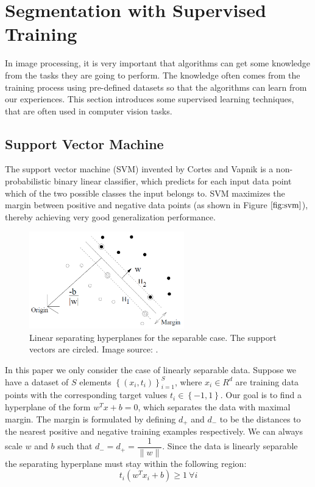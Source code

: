 \documentclass{SMBV13}
\begin{document}
\section{Segmentation with Supervised Training}
\label{sec:supervised_learning}
In image processing, it is very important that algorithms can get some knowledge from the tasks they are going to perform. The knowledge often comes from the training process using pre-defined datasets so that the algorithms can learn from our experiences. This section introduces some supervised learning techniques, that are often used in computer vision tasks.


\subsection{Support Vector Machine}
\label{sec:svm}

The support vector machine (SVM) invented by Cortes and Vapnik \cite{cortes1995support} is a non-probabilistic binary linear classifier, which predicts for each input data point which of the two possible classes the input belongs to. SVM maximizes the margin between positive and negative data points (as shown in Figure $\ref{fig:svm}$), thereby achieving very good generalization performance.

\begin{figure}[htbp]
    \centering
    \includegraphics[width=0.60\textwidth]{Bilder/SMBV13_EMuster_fig9}
    \caption{Linear separating hyperplanes for the separable case. The support vectors are circled. Image source: \cite{burges1998tutorial}.}
    \label{fig:svm}
\end{figure}

In this paper we only consider the case of linearly separable data. Suppose we have a dataset of $S$ elements $\left\lbrace (x_i, t_i)\right\rbrace _{i=1}^S$, where $x_i \in R^d$ are training data points with the corresponding target values $t_i \in \left\lbrace -1, 1\right\rbrace $. Our goal is to find a hyperplane of the form $w^T x + b = 0$, which separates the data with maximal margin. The margin is formulated by defining $d_+$ and $d_-$ to be the distances to the nearest positive and negative training examples respectively. We can always scale $w$ and $b$ such that $d_- = d_+ = \dfrac{1}{\|w\|}$. Since the data is linearly separable the separating hyperplane must stay within the following region:
\begin{equation}
t_i(w^T x_i + b) \geq 1\ \forall i
\label{eq:margin}
\end{equation}
\end{document}
